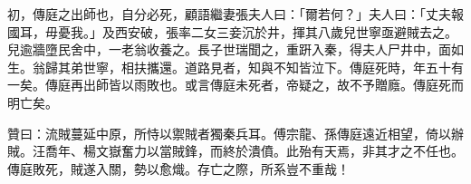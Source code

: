 \begin{pinyinscope}
初，傳庭之出師也，自分必死，顧語繼妻張夫人曰：「爾若何？」夫人曰：「丈夫報國耳，毋憂我。」及西安破，張率二女三妾沉於井，揮其八歲兒世寧亟避賊去之。兒逾牆墮民舍中，一老翁收養之。長子世瑞聞之，重趼入秦，得夫人尸井中，面如生。翁歸其弟世寧，相扶攜還。道路見者，知與不知皆泣下。傳庭死時，年五十有一矣。傳庭再出師皆以雨敗也。或言傳庭未死者，帝疑之，故不予贈廕。傳庭死而明亡矣。

贊曰：流賊蔓延中原，所恃以禦賊者獨秦兵耳。傅宗龍、孫傳庭遠近相望，倚以辦賊。汪喬年、楊文嶽奮力以當賊鋒，而終於潰僨。此殆有天焉，非其才之不任也。傳庭敗死，賊遂入關，勢以愈熾。存亡之際，所系豈不重哉！


\end{pinyinscope}